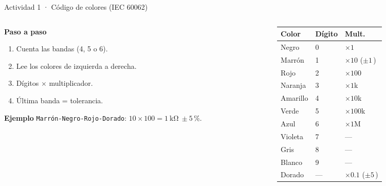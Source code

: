\documentclass[aspectratio=169]{beamer}
\begin{document}
\begin{frame}{Actividad 1 · Código de colores (IEC 60062)}
  \begin{columns}[T]
    \begin{column}{0.52\textwidth}
      \textbf{Paso a paso}
      \begin{enumerate}
        \item Cuenta las bandas (4, 5 o 6).
        \item Lee los colores de izquierda a derecha.
        \item Dígitos $\times$ multiplicador.
        \item Última banda = tolerancia.
      \end{enumerate}
      \textbf{Ejemplo} \texttt{Marrón-Negro-Rojo-Dorado}: $10\times100 = \SI{1}{\kilo\ohm}\ \pm 5\,\text{\%}$.
    \end{column}
    \begin{column}{0.44\textwidth}
      \footnotesize
      \begin{tabular}{lll}
        \toprule
        Color & Dígito & Mult. \\
        \midrule
        Negro & 0 & $\times1$ \\
        Marrón & 1 & $\times10$ ($\pm1$\,\text{\%}) \\
        Rojo & 2 & $\times100$ \\
        Naranja & 3 & $\times1$k \\
        Amarillo & 4 & $\times10$k \\
        Verde & 5 & $\times100$k \\
        Azul & 6 & $\times1$M \\
        Violeta & 7 & — \\
        Gris & 8 & — \\
        Blanco & 9 & — \\
        Dorado & — & $\times0.1$ ($\pm5$\,\text{\%}) \\
        \bottomrule
      \end{tabular}
    \end{column}
  \end{columns}
\end{frame}
\end{document}
